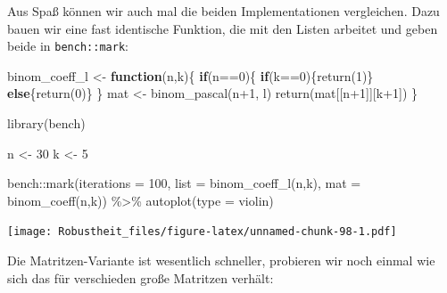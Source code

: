 \documentclass[
]{book}
\newenvironment{Shaded}{\begin{snugshade}}{\end{snugshade}}
\newcommand{\AttributeTok}[1]{\textcolor[rgb]{0.77,0.63,0.00}{#1}}
\newcommand{\ControlFlowTok}[1]{\textcolor[rgb]{0.13,0.29,0.53}{\textbf{#1}}}
\newcommand{\DecValTok}[1]{\textcolor[rgb]{0.00,0.00,0.81}{#1}}
\newcommand{\FunctionTok}[1]{\textcolor[rgb]{0.00,0.00,0.00}{#1}}
\newcommand{\NormalTok}[1]{#1}
\newcommand{\OtherTok}[1]{\textcolor[rgb]{0.56,0.35,0.01}{#1}}
\newcommand{\SpecialCharTok}[1]{\textcolor[rgb]{0.00,0.00,0.00}{#1}}
\newcommand{\StringTok}[1]{\textcolor[rgb]{0.31,0.60,0.02}{#1}}
\begin{document}
Aus Spaß können wir auch mal die beiden Implementationen vergleichen.
Dazu bauen wir eine fast identische Funktion, die mit den Listen arbeitet und geben beide in \texttt{bench::mark}:

\begin{Shaded}
\begin{Highlighting}[]
\NormalTok{binom\_coeff\_l }\OtherTok{\textless{}{-}} \ControlFlowTok{function}\NormalTok{(n,k)\{}
  \ControlFlowTok{if}\NormalTok{(n}\SpecialCharTok{==}\DecValTok{0}\NormalTok{)\{ }
    \ControlFlowTok{if}\NormalTok{(k}\SpecialCharTok{==}\DecValTok{0}\NormalTok{)\{}\FunctionTok{return}\NormalTok{(}\DecValTok{1}\NormalTok{)\} }\ControlFlowTok{else}\NormalTok{\{}\FunctionTok{return}\NormalTok{(}\DecValTok{0}\NormalTok{)\}}
\NormalTok{  \}}
\NormalTok{  mat }\OtherTok{\textless{}{-}} \FunctionTok{binom\_pascal}\NormalTok{(n}\SpecialCharTok{+}\DecValTok{1}\NormalTok{, }\StringTok{\textquotesingle{}l\textquotesingle{}}\NormalTok{)}
  \FunctionTok{return}\NormalTok{(mat[[n}\SpecialCharTok{+}\DecValTok{1}\NormalTok{]][k}\SpecialCharTok{+}\DecValTok{1}\NormalTok{])}
\NormalTok{\}}

\FunctionTok{library}\NormalTok{(bench)}

\NormalTok{n }\OtherTok{\textless{}{-}} \DecValTok{30}
\NormalTok{k }\OtherTok{\textless{}{-}} \DecValTok{5}

\NormalTok{bench}\SpecialCharTok{::}\FunctionTok{mark}\NormalTok{(}\AttributeTok{iterations =} \DecValTok{100}\NormalTok{,}
            \AttributeTok{list =} \FunctionTok{binom\_coeff\_l}\NormalTok{(n,k),}
            \AttributeTok{mat =} \FunctionTok{binom\_coeff}\NormalTok{(n,k)) }\SpecialCharTok{\%\textgreater{}\%} 
  \FunctionTok{autoplot}\NormalTok{(}\AttributeTok{type =} \StringTok{\textquotesingle{}violin\textquotesingle{}}\NormalTok{)}
\end{Highlighting}
\end{Shaded}

\texttt{[image: Robustheit\_files/figure-latex/unnamed-chunk-98-1.pdf]}

Die Matritzen-Variante ist wesentlich schneller, probieren wir noch einmal wie sich das für verschieden große Matritzen verhält:
\end{document}

